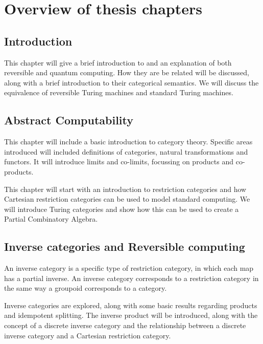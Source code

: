 \chapter*{Overview of thesis chapters}

\section*{Introduction}

This chapter will give a brief introduction to and an explanation of both reversible and quantum
computing. How they are be related will be discussed, along with a brief introduction to their
categorical semantics. We will discuss the equivalence of reversible Turing machines and
standard Turing machines.



\section*{Abstract Computability}

This chapter will include a basic introduction to category theory. Specific areas introduced will
included definitions of categories, natural transformations and functors. It will introduce limits
and co-limits, focussing on products and co-products.

This chapter will start with an introduction to restriction categories and how Cartesian restriction
categories can be used to model standard computing. We will introduce Turing categories and show how
this can be used to create a Partial Combinatory Algebra.

\section*{Inverse categories and Reversible computing}

An inverse category is a specific type of restriction category, in which each map has a partial
inverse. An inverse category corresponds to a restriction category in the same way a groupoid
corresponds to a category.

Inverse categories are explored, along with some basic results regarding products and idempotent
splitting. The inverse product will be introduced, along with the concept of a discrete inverse
category and the relationship between a discrete inverse category and a Cartesian restriction
category.

